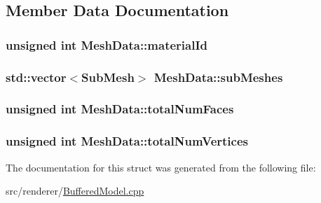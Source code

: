 \subsection{Member Data Documentation}
\hypertarget{structMeshData_afa7dbd31d33ae296a3d64f23f79ba813}{
\subsubsection[{material\-Id}]{\setlength{\rightskip}{0pt plus 5cm}unsigned int Mesh\-Data\-::material\-Id}}\label{structMeshData_afa7dbd31d33ae296a3d64f23f79ba813}
\hypertarget{structMeshData_ad53c530da08754f9ff255ba6250fe8fa}{
\subsubsection[{sub\-Meshes}]{\setlength{\rightskip}{0pt plus 5cm}std\-::vector$<${\bf Sub\-Mesh}$>$ Mesh\-Data\-::sub\-Meshes}}\label{structMeshData_ad53c530da08754f9ff255ba6250fe8fa}
\hypertarget{structMeshData_a299cb84c5c2cc5311c41f855578862da}{
\subsubsection[{total\-Num\-Faces}]{\setlength{\rightskip}{0pt plus 5cm}unsigned int Mesh\-Data\-::total\-Num\-Faces}}\label{structMeshData_a299cb84c5c2cc5311c41f855578862da}
\hypertarget{structMeshData_ac7c4051c8815101f259ad87b9c332031}{
\subsubsection[{total\-Num\-Vertices}]{\setlength{\rightskip}{0pt plus 5cm}unsigned int Mesh\-Data\-::total\-Num\-Vertices}}\label{structMeshData_ac7c4051c8815101f259ad87b9c332031}


The documentation for this struct was generated from the following file\-:\begin{DoxyCompactItemize}
\item 
src/renderer/\hyperlink{BufferedModel_8cpp}{Buffered\-Model.\-cpp}\end{DoxyCompactItemize}
